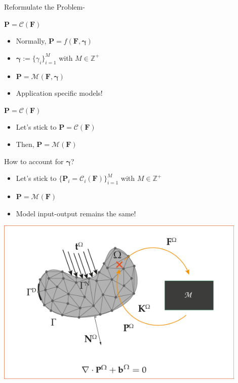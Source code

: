 \begin{frame}{Reformulate the Problem-}
  \begin{minipage}{0.5\textwidth}
{
    \begin{block}{\color{White} $\mathbf{P}=\mathcal{C}(\mathbf{F})$}
      \begin{itemize}
        \item Normally, $\mathbf{P}=f(\mathbf{F}, \boldsymbol\gamma)$
        \item $\boldsymbol{\gamma}:=\{\gamma_i\}_{i=1}^{M}$ with $M\in\mathbb{Z}^+$
        \item $\mathbf{P}=\mathcal{M}(\mathbf{F}, \boldsymbol{\gamma})$
        \item Application specific models! 
      \end{itemize}
    \end{block} 
}
{
    \begin{block}{\color{White} $\mathbf{P}=\mathcal{C}(\mathbf{F})$}
      \begin{itemize}
        \item Let's stick to $\mathbf{P}=\mathcal{C}(\mathbf{F})$
        \item Then, $\mathbf{P}=\mathcal{M}(\mathbf{F})$
      \end{itemize}
    \end{block} 
    \begin{block}{\color{White} How to account for $\boldsymbol{\gamma}$?}
      \begin{itemize}
        \item Let's stick to $\{\mathbf{P}_i=\mathcal{C}_i(\mathbf{F})\}_{i=1}^{M}$ with $M\in\mathbb{Z}^+$
        \item $\mathbf{P}=\mathcal{M}(\mathbf{F})$
        \item Model input-output remains the same!
      \end{itemize}
    \end{block} 
}
  \end{minipage}%
  \begin{minipage}{0.5\textwidth}
    \centering
    \includegraphics[width=0.9\textwidth]{Figures/literature/FE2-ML.pdf} 
  \end{minipage}
\end{frame}

